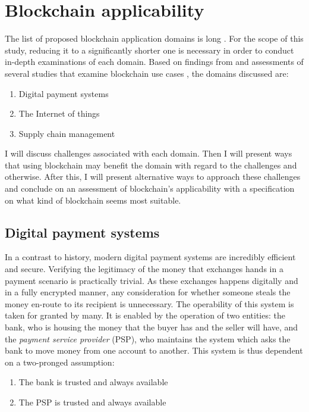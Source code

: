\section{Blockchain applicability} \label{applications}

The list of proposed blockchain application domains is long
\cite{zileUseCases}. For the scope of this study, reducing it to a
significantly shorter one is necessary in order to conduct in-depth
examinations of each domain. Based on findings from \cite{jaoudeApplications} 
and assessments of several studies that examine blockchain use cases
\cite{sankaScalability,wustBlockchainNeed,zhengChallenges}, the
domains discussed are:

\begin{enumerate}
  \item Digital payment systems
  \item The Internet of things
  \item Supply chain management
\end{enumerate}

I will discuss challenges associated with each domain. Then I will present
ways that using blockchain may benefit the domain with regard to the
challenges and otherwise. After this, I will present alternative ways
to approach these challenges and conclude on an assessment of blockchain's
applicability with a specification on what kind of blockchain seems most
suitable.

\subsection{Digital payment systems}

In a contrast to history, modern digital payment systems are
incredibly efficient and secure. Verifying the legitimacy of the money
that exchanges hands in a payment scenario is practically trivial. As
these exchanges happens digitally and in a fully encrypted manner, any
consideration for whether someone steals the money en-route to its
recipient is unnecessary. The operability of this system is taken for
granted by many. It is enabled by the operation of two entities: the
bank, who is housing the money that the buyer has and the seller will
have, and the \textit{payment service provider} (PSP), who maintains
the system which asks the bank to move money from one account to
another. This system is thus dependent on a two-pronged assumption:
\begin{enumerate}
  \item The bank is trusted and always available
  \item The PSP is trusted and always available
\end{enumerate}

